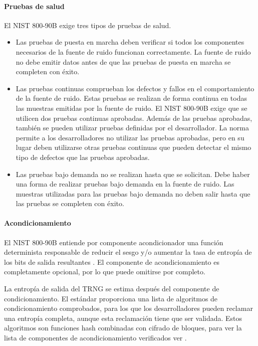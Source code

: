             \paragraph{Pruebas de salud\\}
            
            El NIST 800-90B exige tres tipos de pruebas de salud.
            
            \begin{itemize}[noitemsep]
                \item Las pruebas de puesta en marcha deben verificar si todos los componentes necesarios de la fuente de ruido funcionan correctamente. La fuente de ruido no debe emitir datos antes de que las pruebas de puesta en marcha se completen con éxito.
                \item Las pruebas continuas comprueban los defectos y fallos en el comportamiento de la fuente de ruido. Estas pruebas se realizan de forma continua en todas las muestras emitidas por la fuente de ruido. El NIST 800-90B exige que se utilicen dos pruebas continuas aprobadas. Además de las pruebas aprobadas, también se pueden utilizar pruebas definidas por el desarrollador. La norma permite a los desarrolladores no utilizar las pruebas aprobadas, pero en su lugar deben utilizarse otras pruebas continuas que pueden detectar el mismo tipo de defectos que las pruebas aprobadas.
                \item Las pruebas bajo demanda no se realizan hasta que se solicitan. Debe haber una forma de realizar pruebas bajo demanda en la fuente de ruido. Las muestras utilizadas para las pruebas bajo demanda no deben salir hasta que las pruebas se completen con éxito.
            \end{itemize}
            
            \paragraph{Acondicionamiento\\}
            
            El NIST 800-90B entiende por componente acondicionador una función determinista responsable de reducir el sesgo y/o aumentar la tasa de entropía de los bits de salida resultantes \cite{Turan2018}. El componente de acondicionamiento es completamente opcional, por lo que puede omitirse por completo.
            
            La entropía de salida del TRNG se estima después del componente de condicionamiento. El estándar proporciona una lista de algoritmos de condicionamiento comprobados, para los que los desarrolladores pueden reclamar una entropía completa, aunque esta reclamación tiene que ser validada. Estos algoritmos son funciones hash combinadas con cifrado de bloques, para ver la lista de componentes de acondicionamiento verificados ver \cite{Turan2018}.
            

